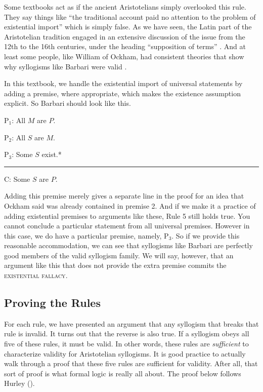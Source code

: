 Some textbooks act as if the ancient Aristotelians simply overlooked this rule. They say things like ``the traditional account paid no attention to the problem of existential import'' which is simply false. As we have seen, the Latin part of the Aristotelian tradition engaged in an extensive discussion of the issue from the 12th to the 16th centuries, under the heading ``supposition of terms'' \citep{Read2002}. And at least some people, like William of Ockham, had consistent theories that show why syllogisms like Barbari were valid \citep{Parsons2008}. 

In this textbook, we handle the existential import of universal statements by adding a premise, where appropriate, which makes the existence assumption explicit. So Barbari should look like this.

\begin{earg}
\item[P$_1$:] All $M$ are $P$.
\item[P$_2$:] All $S$ are $M$.
\item[P$_3$:] Some $S$ exist.*
\vspace{-.5em}
\item [] \rule{0.2\linewidth}{.5pt} 
\item[C:] Some $S$ are $P$.
\end{earg} 

Adding this premise merely gives a separate line in the proof for an idea that Ockham said was already contained in premise 2. And if we make it a practice of adding existential premises to arguments like these, Rule 5 still holds true. You cannot conclude a particular statement from all universal premises. However in this case, we do have a particular premise, namely, P$_3$. So if we provide this reasonable accommodation, we can see that syllogisms like Barbari are perfectly good members of the valid syllogism family. We will say, however, that an argument like this that does not provide the extra premise commits the 
\textsc{\gls{existential fallacy}}. \label{def:existential_fallacy}



\subsection{Proving the Rules}

For each rule, we have presented an argument that any syllogism that breaks that rule is invalid. It turns out that the reverse is also true. If a syllogism obeys all five of these rules, it must be valid. In other words, these rules are \emph{sufficient} to characterize validity for Aristotelian syllogisms.  It is good practice to actually walk through a proof that these five rules are sufficient for validity. After all, that sort of proof is what formal logic is really all about. The proof below follows Hurley (\citeyear{Hurley2014}).

